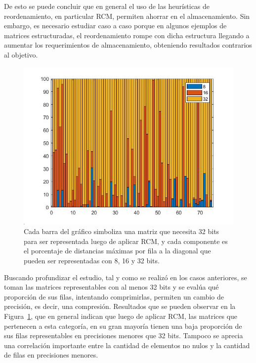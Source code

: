 
De esto se puede concluir que en general el uso de las heurísticas de reordenamiento, en particular RCM, permiten ahorrar en el almacenamiento. Sin embargo, es necesario estudiar caso a caso porque en algunos ejemplos de matrices estructuradas, el reordenamiento rompe con dicha estructura llegando a aumentar los requerimientos de almacenamiento, obteniendo resultados contrarios al objetivo.


\begin{figure}[h]
    \centering
    \includegraphics[width=.8\textwidth,height=.5\textwidth]{imagenes/chap4/bar_row_porc_per_cat_32_rcm.jpg}
    \caption{Cada barra del gráfico simboliza una matriz que necesita 32 bits para ser representada luego de aplicar RCM, y cada componente es el porcentaje de distancias máximas por fila a la diagonal que pueden ser representadas con 8, 16 y 32 bits.}
    \label{fig:bar_row_porc_per_cat_32_rcm}
\end{figure}

Buscando profundizar el estudio, tal y como se realizó en los casos anteriores, se toman las matrices representables con al menos 32 bits y se evalúa qué proporción de sus filas, intentando comprimirlas, permiten un cambio de precisión, es decir, una compresión. %
Resultados que se pueden observar en la Figura~\ref{fig:bar_row_porc_per_cat_32_rcm}, que en general indican que luego de aplicar RCM, las matrices que pertenecen a esta categoría, en su gran mayoría tienen una baja proporción de sus filas representables en precisiones menores que 32 bits. Tampoco se aprecia una correlación importante entre la cantidad de elementos no nulos y la cantidad de filas en precisiones menores.




